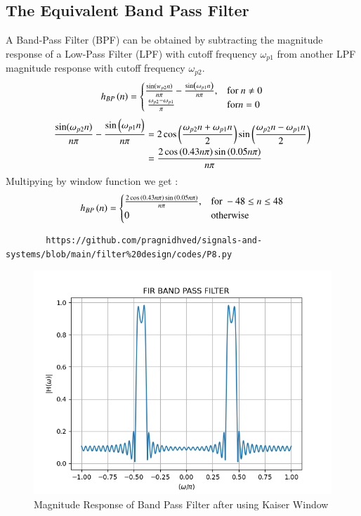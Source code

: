 \documentclass{article}
\begin{document}
	\subsection{The Equivalent Band Pass Filter}
	A Band-Pass Filter (BPF) can be obtained by subtracting the magnitude response of a Low-Pass Filter (LPF) with cutoff frequency $\omega_{p1}$ from another LPF magnitude response with cutoff frequency $\omega_{p2}$.
	\begin{align}
		h_{BP}\left(n\right) = 
		\begin{cases} 
			\frac{\sin(w_{p2} n)}{n\pi} -\frac{\sin\left(\omega_{p1}n\right)}{n\pi},  & \text{for } n\neq 0\\\
			\frac{\omega_{p2}-\omega_{p1}}{\pi} &\text{for} n= 0
		\end{cases} \label{eq:h(n)desired_for_LPF}
	\end{align}
	\begin{align}
		\frac{\sin(\omega_{p2} n)}{n\pi} -\frac{\sin\left(\omega_{p1}n\right)}{n\pi} &= 2\cos{\ensuremath{\left(\frac{\omega_{p2}n+\omega_{p1}n}{2}\right)}}\sin{\ensuremath{\left(\frac{\omega_{p2}n-\omega_{p1}n}{2}\right)}}\\
		&= \frac{2\cos{\ensuremath{\left(0.43n\pi\right)}}\sin{\ensuremath{\left(0.05n\pi\right)}}}{n\pi}
	\end{align}
	Multipying by window function we get :
	\begin{align}
		h_{BP}\left(n\right) = 
		\begin{cases} 
			\frac{2\cos{\ensuremath{\left(0.43n\pi\right)}}\sin{\ensuremath{\left(0.05n\pi\right)}}}{n\pi},  & \text{for } -48\leq n \leq 48 \\
			0 &\text{otherwise}
		\end{cases} \label{eq:h(n)desired_for_LPF}
	\end{align}
	\begin{lstlisting}
		https://github.com/pragnidhved/signals-and-systems/blob/main/filter%20design/codes/P8.py
	\end{lstlisting}
	\begin{figure}[htbp]
		\centering
		\includegraphics[width=1\linewidth]{figs/fig8}
		\caption{Magnitude Response of Band Pass Filter after using Kaiser Window}
		\label{fig:Kaiser_BPF_response}
	\end{figure}
\end{document}
